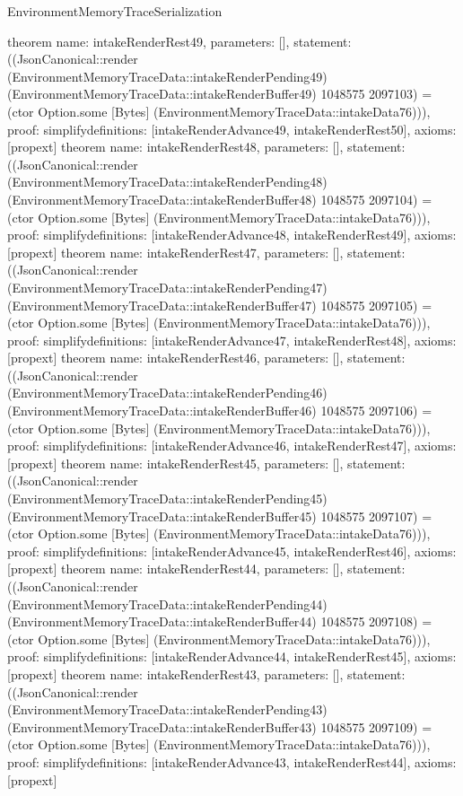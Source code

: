 \begin{lexlean}{EnvironmentMemoryTraceSerialization}
\begin{semanticmodule}
{}
theorem{
 name: intakeRenderRest49, parameters: [],
 statement: ((JsonCanonical::render (EnvironmentMemoryTraceData::intakeRenderPending49) (EnvironmentMemoryTraceData::intakeRenderBuffer49) 1048575 2097103) = (ctor Option.some [Bytes] (EnvironmentMemoryTraceData::intakeData76))), proof: simplify{definitions: [intakeRenderAdvance49, intakeRenderRest50]}, axioms: [propext]
}
theorem{
 name: intakeRenderRest48, parameters: [],
 statement: ((JsonCanonical::render (EnvironmentMemoryTraceData::intakeRenderPending48) (EnvironmentMemoryTraceData::intakeRenderBuffer48) 1048575 2097104) = (ctor Option.some [Bytes] (EnvironmentMemoryTraceData::intakeData76))), proof: simplify{definitions: [intakeRenderAdvance48, intakeRenderRest49]}, axioms: [propext]
}
theorem{
 name: intakeRenderRest47, parameters: [],
 statement: ((JsonCanonical::render (EnvironmentMemoryTraceData::intakeRenderPending47) (EnvironmentMemoryTraceData::intakeRenderBuffer47) 1048575 2097105) = (ctor Option.some [Bytes] (EnvironmentMemoryTraceData::intakeData76))), proof: simplify{definitions: [intakeRenderAdvance47, intakeRenderRest48]}, axioms: [propext]
}
theorem{
 name: intakeRenderRest46, parameters: [],
 statement: ((JsonCanonical::render (EnvironmentMemoryTraceData::intakeRenderPending46) (EnvironmentMemoryTraceData::intakeRenderBuffer46) 1048575 2097106) = (ctor Option.some [Bytes] (EnvironmentMemoryTraceData::intakeData76))), proof: simplify{definitions: [intakeRenderAdvance46, intakeRenderRest47]}, axioms: [propext]
}
theorem{
 name: intakeRenderRest45, parameters: [],
 statement: ((JsonCanonical::render (EnvironmentMemoryTraceData::intakeRenderPending45) (EnvironmentMemoryTraceData::intakeRenderBuffer45) 1048575 2097107) = (ctor Option.some [Bytes] (EnvironmentMemoryTraceData::intakeData76))), proof: simplify{definitions: [intakeRenderAdvance45, intakeRenderRest46]}, axioms: [propext]
}
theorem{
 name: intakeRenderRest44, parameters: [],
 statement: ((JsonCanonical::render (EnvironmentMemoryTraceData::intakeRenderPending44) (EnvironmentMemoryTraceData::intakeRenderBuffer44) 1048575 2097108) = (ctor Option.some [Bytes] (EnvironmentMemoryTraceData::intakeData76))), proof: simplify{definitions: [intakeRenderAdvance44, intakeRenderRest45]}, axioms: [propext]
}
theorem{
 name: intakeRenderRest43, parameters: [],
 statement: ((JsonCanonical::render (EnvironmentMemoryTraceData::intakeRenderPending43) (EnvironmentMemoryTraceData::intakeRenderBuffer43) 1048575 2097109) = (ctor Option.some [Bytes] (EnvironmentMemoryTraceData::intakeData76))), proof: simplify{definitions: [intakeRenderAdvance43, intakeRenderRest44]}, axioms: [propext]
}
\end{semanticmodule}
\end{lexlean}
